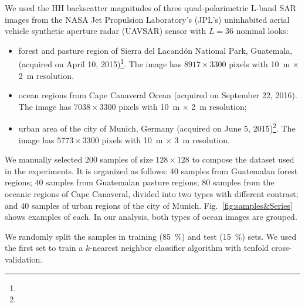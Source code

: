 \documentclass[journal]{IEEEtran}
\begin{document}
We used the HH backscatter magnitudes of three quad-polarimetric L-band SAR images from the NASA Jet Propulsion Laboratory’s (JPL’s) uninhabited aerial vehicle synthetic aperture radar (UAVSAR) sensor with $L=36$ nominal looks:
\begin{itemize}
	\item forest and pasture region of Sierra del Lacandón National Park, Guatemala, (acquired on April 10, 2015)\footnote{}. 
	The image has $8917 \times 3300$ pixels with 
	\SI[inter-unit-product =$\cdot$]{10}{\meter} $\times$ \SI[inter-unit-product =$\cdot$]{2}{\meter} resolution.
	\item ocean regions from Cape Canaveral Ocean (acquired on September 22, 2016).
	The image has $7038 \times 3300$ pixels with 
	\SI[inter-unit-product =$\cdot$]{10}{\meter} $\times$ \SI[inter-unit-product =$\cdot$]{2}{\meter} resolution;
	\item urban area of the city of Munich, Germany (acquired on June 5, 2015)\footnote{}.
	The image has $5773 \times 3300$ pixels with 
	\SI[inter-unit-product =$\cdot$]{10}{\meter} $\times$ \SI[inter-unit-product =$\cdot$]{3}{\meter} resolution.
\end{itemize}

We manually selected $200$ samples of size $128 \times 128$ to compose the dataset used in the experiments.
It is organized as follows:
$40$ samples from Guatemalan forest regions;
$40$ samples from Guatemalan pasture regions;
$80$ samples from the oceanic regions of Cape Canaveral, divided into two types with different contrast; and
$40$ samples of urban regions of the city of Munich.
Fig.~\ref{fig:samples&Series} shows examples of each. In our analysis, both types of ocean images are grouped.

We randomly split the samples in training (\SI{85}{\percent}) and test (\SI{15}{\percent}) sets.
We used the first set to train a $k$-nearest neighbor classifier algorithm with tenfold
cross-validation.
\end{document}
